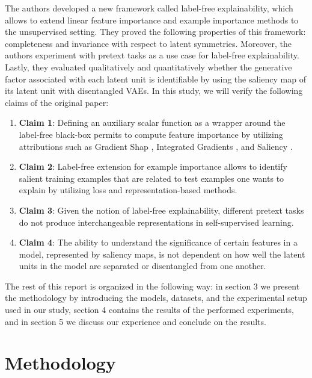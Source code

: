 The authors developed a new framework called label-free explainability, which allows to extend linear feature importance and example importance methods to the unsupervised setting. They proved the following properties of this framework: completeness and invariance with respect to latent symmetries. Moreover, the authors experiment with pretext tasks as a use case for label-free explainability. Lastly, they evaluated qualitatively and quantitatively whether the generative factor associated with each latent unit is identifiable by using the saliency map of its latent unit with disentangled VAEs. In this study, we will verify the following claims of the original paper: 

\begin{enumerate}[label=\textbullet, ref=\arabic*]
   \item \textbf{Claim 1}: Defining an auxiliary scalar function as a wrapper around the label-free black-box permits to compute feature importance by utilizing attributions such as Gradient Shap \cite{GradientShap}, Integrated Gradients \cite{IntegratedGradients}, and Saliency \cite{saliency}. \label{claim1}
   \item \textbf{Claim 2}: Label-free extension for example importance allows to identify salient training examples that are related to test examples one wants to explain by utilizing loss and representation-based methods.\label{claim2}
   \item \textbf{Claim 3}: Given the notion of label-free explainability, different pretext tasks do not produce interchangeable representations in self-supervised learning.\label{claim3}
   \item \textbf{Claim 4}: The ability to understand the significance of certain features in a model, represented by saliency maps, is not dependent on how well the latent units in the model are separated or disentangled from one another.\label{claim4}
\end{enumerate}

The rest of this report is organized in the following way: in section 3 we present the methodology by introducing the models, datasets, and the experimental setup used in our study, section 4 contains the results of the performed experiments, and in section 5 we discuss our experience and conclude on the results.


\section{Methodology}

